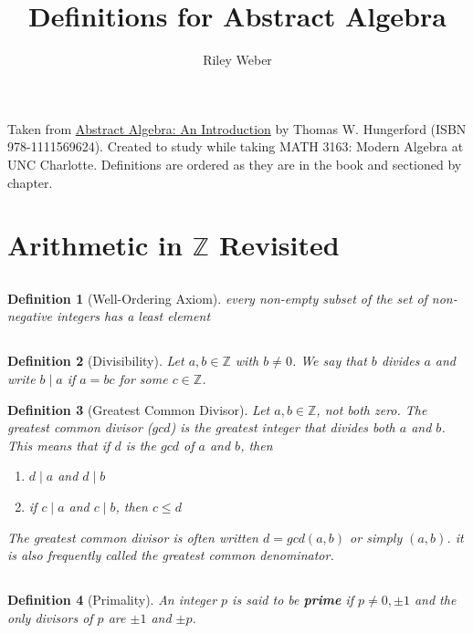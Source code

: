 \documentclass{article}
\theoremstyle{break}
\newtheorem{definition}{Definition}[subsection]
\newcommand*{\Z}{\mathbb{Z}}
\begin{document}
\title{Definitions for Abstract Algebra}
\author{Riley Weber}
\maketitle

Taken from \underline{Abstract Algebra: An Introduction} by Thomas W.
Hungerford (ISBN 978-1111569624). Created to study while taking MATH 3163:
Modern Algebra at UNC Charlotte. Definitions are ordered as they are in the
book and sectioned by chapter.

\section{Arithmetic in $\Z$ Revisited}
\subsection{}

\begin{definition}[Well-Ordering Axiom] 
  every non-empty subset of the set of non-negative integers has a least 
  element
\end{definition}

\subsection{}
\begin{definition}[Divisibility]
  Let $a, b \in \Z$ with $b \neq 0$. We say that $b$ divides $a$ and
  write $b \mid a$ if $a=bc$ for some $c \in \Z$.
\end{definition}

\begin{definition}[Greatest Common Divisor]
  Let $a, b \in \Z$, not both zero. The greatest common divisor ($gcd$) is
  the greatest integer that divides both $a$ and $b$. This means that if $d$ is
  the $gcd$ of $a$ and $b$, then
  \begin{enumerate}
    \item $d \mid a$ and $d \mid b$
    \item if $c \mid a$ and $c \mid b$, then $c \leq d$
  \end{enumerate}
  The greatest common divisor is often written $d = gcd(a,b)$ or simply
  $(a,b)$. it is also frequently called the greatest common \emph{denominator}.
\end{definition}

\subsection{}
\begin{definition}[Primality]
  An integer $p$ is said to be \textbf{prime} if $p \neq 0, \pm 1$ and the
  only divisors of $p$ are $\pm 1$ and $\pm p$.
\end{definition}
\end{document}
